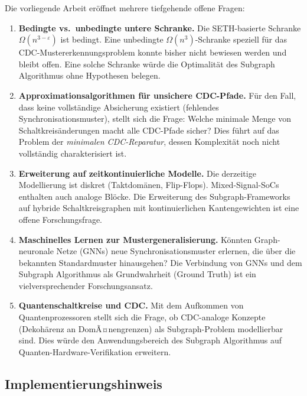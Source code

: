 ﻿\documentclass[a4paper,12pt]{article}
\theoremstyle{definition}
\begin{document}
	Die vorliegende Arbeit er\"offnet mehrere tiefgehende offene Fragen:
	
	\begin{enumerate}
		
		\item \textbf{Bedingte vs.\ unbedingte untere Schranke.}
		Die SETH-basierte Schranke $\Omega(n^{3-\varepsilon})$ ist bedingt.
		Eine unbedingte $\Omega(n^3)$-Schranke speziell f\"ur das
		CDC-Mustererkennungs\-problem konnte bisher nicht bewiesen werden und bleibt
		offen. Eine solche Schranke w\"urde die Optimalit\"at des Subgraph
		Algorithmus ohne Hypothesen belegen.
		
		\item \textbf{Approximationsalgorithmen f\"ur unsichere CDC-Pfade.}
		F\"ur den Fall, dass keine vollst\"andige Absicherung existiert
		(fehlendes Synchronisationsmuster), stellt sich die Frage:
		Welche minimale Menge von Schaltkreis\"anderungen macht alle
		CDC-Pfade sicher? Dies f\"uhrt auf das Problem der
		\emph{minimalen CDC-Reparatur}, dessen Komplexit\"at noch nicht
		vollst\"andig charakterisiert ist.
		
		\item \textbf{Erweiterung auf zeitkontinuierliche Modelle.}
		Die derzeitige Modellierung ist diskret (Taktdom\"anen, Flip-Flops).
		Mixed-Signal-SoCs enthalten auch analoge Bl\"ocke.
		Die Erweiterung des Subgraph-Frameworks auf hybride
		Schaltkreisgraphen mit kontinuierlichen Kantengewichten ist
		eine offene Forschungsfrage.
		
		\item \textbf{Maschinelles Lernen zur Mustergeneralisierung.}
		K\"onnten Graph-neuronale Netze (GNNs) neue Synchronisationsmuster
		erlernen, die \"uber die bekannten Standardmuster hinausgehen?
		Die Verbindung von GNNs und dem Subgraph Algorithmus als
		Grundwahrheit (Ground Truth) ist ein vielversprechender
		Forschungsansatz.
		
		\item \textbf{Quantenschaltkreise und CDC.}
		Mit dem Aufkommen von Quantenprozessoren stellt sich die Frage,
		ob CDC-analoge Konzepte (Dekoh\"arenz an DomÃ¤nengrenzen) als
		Subgraph-Problem modellierbar sind. Dies w\"urde den Anwendungsbereich
		des Subgraph Algorithmus auf Quanten-Hardware-Verifikation erweitern.
		
	\end{enumerate}
	
	\subsection{Implementierungshinweis}
	
\end{document}
